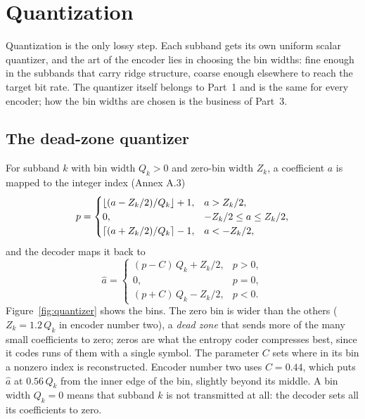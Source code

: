 \section{Quantization}
\label{sec:quantization}

Quantization is the only lossy step. Each subband gets its own uniform scalar quantizer, and
the art of the encoder lies in choosing the bin widths: fine enough in the subbands that
carry ridge structure, coarse enough elsewhere to reach the target bit rate. The quantizer
itself belongs to Part~1 and is the same for every encoder; how the bin widths are chosen is
the business of Part~3.

\subsection{The dead-zone quantizer}

For subband $k$ with bin width $Q_k > 0$ and zero-bin width $Z_k$, a coefficient $a$ is mapped
to the integer index (Annex A.3)
\begin{equation}
  p = \begin{cases}
    \lfloor (a - Z_k/2)/Q_k \rfloor + 1, & a > Z_k/2,\\
    0, & -Z_k/2 \le a \le Z_k/2,\\
    \lceil (a + Z_k/2)/Q_k \rceil - 1, & a < -Z_k/2,
  \end{cases}
  \label{eq:quantize}
\end{equation}
and the decoder maps it back to
\begin{equation}
  \hat a = \begin{cases}
    (p - C)\,Q_k + Z_k/2, & p > 0,\\
    0, & p = 0,\\
    (p + C)\,Q_k - Z_k/2, & p < 0.
  \end{cases}
  \label{eq:dequantize}
\end{equation}
Figure~\ref{fig:quantizer} shows the bins. The zero bin is wider than the others
($Z_k = 1.2\,Q_k$ in encoder number two), a \emph{dead zone} that sends more of the many small
coefficients to zero; zeros are what the entropy coder compresses best, since it codes runs of
them with a single symbol. The parameter $C$ sets where in its bin a nonzero index is
reconstructed. Encoder number two uses $C = 0.44$, which puts $\hat a$ at $0.56\,Q_k$ from the
inner edge of the bin, slightly beyond its middle. A bin width $Q_k = 0$ means that subband $k$
is not transmitted at all: the decoder sets all its coefficients to zero.

